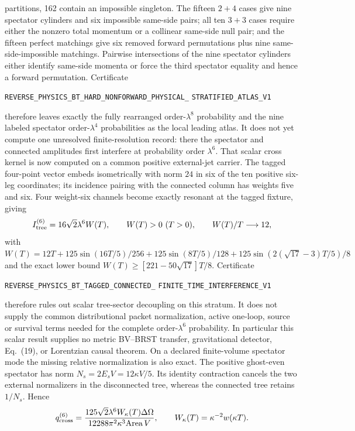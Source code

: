 \documentclass[11pt]{article}
\theoremstyle{definition}
\theoremstyle{remark}
\begin{document}
partitions, 162 contain an impossible singleton.  The fifteen $2+4$ cases
give nine spectator cylinders and six impossible same-side pairs; all ten
$3+3$ cases require either the nonzero total momentum or a collinear
same-side null pair; and the fifteen perfect matchings give six removed
forward permutations plus nine same-side-impossible matchings.  Pairwise
intersections of the nine spectator cylinders either identify same-side
momenta or force the third spectator equality and hence a forward
permutation.  Certificate
\par\noindent
\texttt{REVERSE\_PHYSICS\_BT\_HARD\_NONFORWARD\_PHYSICAL\_}
\allowbreak\texttt{STRATIFIED\_ATLAS\_V1}
\par\noindent
therefore leaves exactly the fully rearranged order-$\lambda^8$ probability
and the nine labeled spectator order-$\lambda^4$ probabilities as the local
leading atlas.  It does not yet compute one unresolved finite-resolution
record: there the spectator and connected amplitudes first interfere at
probability order $\lambda^6$.  That scalar cross kernel is now computed on a
common positive external-jet carrier.  The tagged four-point vector embeds
isometrically with norm $24$ in six of the ten positive six-leg coordinates;
its incidence pairing with the connected column has weights five and six.
Four weight-six channels become exactly resonant at the tagged fixture, giving
\[
 I_{\rm tree}^{(6)}=16\sqrt2\lambda^6W(T),
 \qquad W(T)>0\ (T>0),\qquad W(T)/T\longrightarrow12,
\]
with
$W(T)=12T+125\sin(16T/5)/256+125\sin(8T/5)/128
+125\sin(2(\sqrt{17}-3)T/5)/8$ and the exact lower bound
$W(T)\geq[221-50\sqrt{17}]T/8$.
Certificate
\par\noindent
\texttt{REVERSE\_PHYSICS\_BT\_TAGGED\_CONNECTED\_}
\allowbreak\texttt{FINITE\_TIME\_INTERFERENCE\_V1}
\par\noindent
therefore rules out scalar tree-sector decoupling on this stratum.  It does
not supply the common distributional packet normalization, active one-loop,
source or survival terms needed for the complete order-$\lambda^6$
probability.  In particular this scalar result supplies no metric BV--BRST
transfer, gravitational detector, Eq.~(19), or Lorentzian causal theorem.
On a declared finite-volume spectator mode the missing relative normalization
is also exact.  The positive ghost-even spectator has norm
$N_s=2E_sV=12\kappa V/5$.  Its identity contraction cancels the two external
normalizers in the disconnected tree, whereas the connected tree retains
$1/N_s$.  Hence
\[
 q_{\rm cross}^{(6)}=
 \frac{125\sqrt2\lambda^6W_\kappa(T)\Delta\Omega}
 {12288\pi^2\kappa^3\mathrm{Area}\,V},
 \qquad W_\kappa(T)=\kappa^{-2}w(\kappa T).
\]
\end{document}
